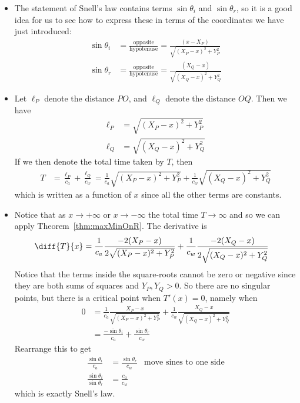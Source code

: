 \begin{eg}
\begin{itemize}
\item The statement of Snell's law contains terms $\sin \theta_i$ and $\sin
\theta_r$, so it is a good idea for us to see how to express these in terms of
the coordinates we have just introduced:
\begin{align*}
  \sin \theta_i &=  \frac{\text{opposite}}{\text{hypotenuse}}
  = \frac{(x-X_P)}{\sqrt{(X_P-x)^2 + Y_P^2}}\\
  \sin \theta_r &=  \frac{\text{opposite}}{\text{hypotenuse}}
  = \frac{(X_Q-x)}{\sqrt{(X_Q-x)^2 + Y_Q^2}}
\end{align*}

\item Let $\ell_P$ denote the distance $PO$, and $\ell_Q$ denote the distance
$OQ$. Then we have
\begin{align*}
  \ell_P &= \sqrt{(X_P-x)^2+Y_P^2} \\
  \ell_Q &= \sqrt{(X_Q-x)^2+Y_Q^2}
\end{align*}
If we then denote the total time taken by $T$, then
\begin{align*}
  T &= \frac{\ell_P}{c_a} + \frac{\ell_Q}{c_w}
  = \frac{1}{c_a}\sqrt{(X_P-x)^2+Y_P^2} + \frac{1}{c_w}\sqrt{(X_Q-x)^2+Y_Q^2}
\end{align*}
which is written as a function of $x$ since all the other terms are
constants.

\item Notice that as $x \to +\infty$ or $x\to-\infty$ the total time $T \to
\infty$ and so we can apply Theorem~\ref{thm:maxMinOnR}. The derivative is
\begin{align*}
  \diff{T}{x} &=
  \frac{1}{c_a} \frac{-2(X_P-x)}{2\sqrt{(X_P-x)^2+Y_P^2}} +
  \frac{1}{c_w} \frac{-2(X_Q-x)}{2\sqrt{(X_Q-x)^2+Y_Q^2}}
\end{align*}
Notice that the terms inside the square-roots cannot be zero or negative since
they are both sums of squares and $Y_P,Y_Q > 0$. So there are no singular
points, but there is a critical point when $T'(x) = 0$, namely when
\begin{align*}
  0 &= \frac{1}{c_a} \frac{X_P-x}{\sqrt{(X_P-x)^2+Y_P^2}} +
  \frac{1}{c_w} \frac{X_Q-x}{\sqrt{(X_Q-x)^2+Y_Q^2}} \\
  &= \frac{-\sin\theta_i}{c_a} + \frac{\sin\theta_r}{c_w}
\end{align*}
Rearrange this to get
\begin{align*}
  \frac{\sin\theta_i}{c_a} &= \frac{\sin\theta_r}{c_w} & \text{move sines to
one side}\\
  \frac{\sin\theta_i}{\sin \theta_r} &= \frac{c_a}{c_w}
\end{align*}
which is exactly Snell's law.
\end{itemize}
\end{eg}


